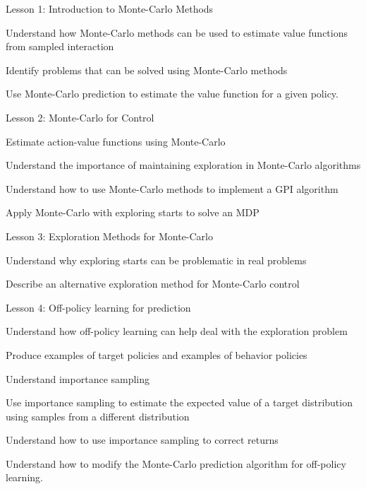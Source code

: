 \documentclass[lang=en,mode=geye,device=normal,color=blue,14pt]{elegantnote}
\DeclareMathOperator*{\1}{\mathbbm{1}}
\begin{document}
Lesson 1: Introduction to Monte-Carlo Methods 

Understand how Monte-Carlo methods can be used to estimate value functions from sampled interaction 

Identify problems that can be solved using Monte-Carlo methods 

Use Monte-Carlo prediction to estimate the value function for a given policy. 

Lesson 2: Monte-Carlo for Control 

Estimate action-value functions using Monte-Carlo 

Understand the importance of maintaining exploration in Monte-Carlo algorithms 

Understand how to use Monte-Carlo methods to implement a GPI algorithm

Apply Monte-Carlo with exploring starts to solve an MDP 

Lesson 3: Exploration Methods for Monte-Carlo 

Understand why exploring starts can be problematic in real problems 

Describe an alternative exploration method for Monte-Carlo control 

Lesson 4: Off-policy learning for prediction 

Understand how off-policy learning can help deal with the exploration problem 

Produce examples of target policies and examples of behavior policies

Understand importance sampling 

Use importance sampling to estimate the expected value of a target distribution using samples from a different distribution

Understand how to use importance sampling to correct returns 

Understand how to modify the Monte-Carlo prediction algorithm for off-policy learning.






\end{document}
